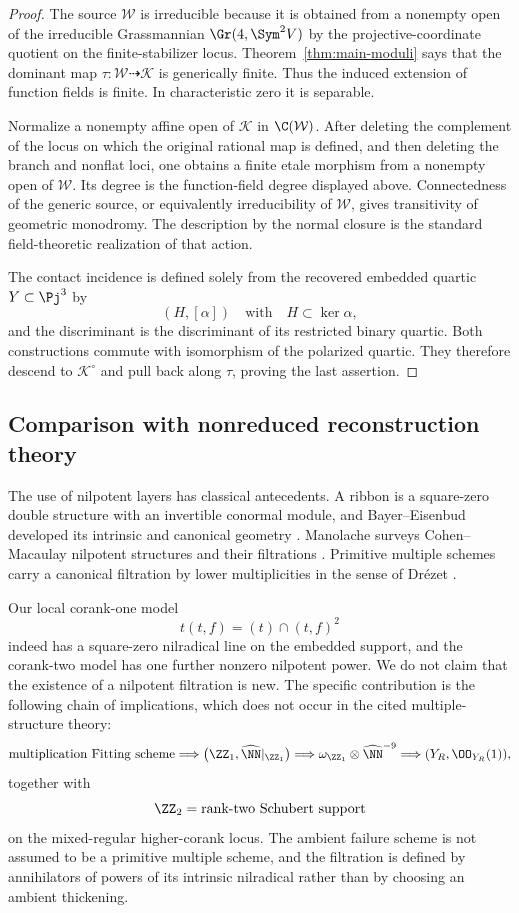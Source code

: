 \begin{proof}
The source \(\mathcal W\) is irreducible because it is obtained from a
nonempty open of the irreducible Grassmannian
\(\Gr(4,\Sym^2V)\) by the projective-coordinate quotient on the
finite-stabilizer locus.  Theorem~\ref{thm:main-moduli} says that the
dominant map \(\tau:\mathcal W\dashrightarrow\mathcal K\) is
generically finite.  Thus the induced extension of function fields is
finite.  In characteristic zero it is separable.

Normalize a nonempty affine open of \(\mathcal K\) in
\(\C(\mathcal W)\).  After deleting the complement of the locus on
which the original rational map is defined, and then deleting the
branch and nonflat loci, one obtains a finite etale morphism from a
nonempty open of \(\mathcal W\).  Its degree is the function-field
degree displayed above.  Connectedness of the generic source, or
equivalently irreducibility of \(\mathcal W\), gives transitivity of
geometric monodromy.  The description by the normal closure is the
standard field-theoretic realization of that action.

The contact incidence is defined solely from the recovered embedded
quartic \(Y\subset\Pj^3\) by
\[
 (H,[\alpha])\quad\text{with}\quad H\subset\ker\alpha,
\]
and the discriminant is the discriminant of its restricted binary
quartic.  Both constructions commute with isomorphism of the polarized
quartic.  They therefore descend to \(\mathcal K^\circ\) and pull
back along \(\tau\), proving the last assertion.
\end{proof}



\subsection{Comparison with nonreduced reconstruction theory}

The use of nilpotent layers has classical antecedents.  A ribbon is a
square-zero double structure with an invertible conormal module, and
Bayer--Eisenbud developed its intrinsic and canonical geometry
\cite{BayerEisenbud}.  Manolache surveys Cohen--Macaulay nilpotent
structures and their filtrations \cite{Manolache}.  Primitive multiple
schemes carry a canonical filtration by lower multiplicities in the
sense of Drézet \cite{Drezet}.

Our local corank-one model
\[
 t(t,f)=(t)\cap(t,f)^2
\]
indeed has a square-zero nilradical line on the embedded support, and
the corank-two model has one further nonzero nilpotent power.  We do
not claim that the existence of a nilpotent filtration is new.  The
specific contribution is the following chain of implications, which
does not occur in the cited multiple-structure theory:
\[
 \text{multiplication Fitting scheme}
 \Longrightarrow
 \bigl(\ZZ_1,\widehat\NN|_{\ZZ_1}\bigr)
 \Longrightarrow
 \omega_{\ZZ_1}\otimes\widehat\NN^{-9}
 \Longrightarrow
 (Y_R,\OO_{Y_R}(1)),
\]
together with
\[
 \ZZ_2=\text{rank-two Schubert support}
\]
on the mixed-regular higher-corank locus.  The ambient failure scheme
is not assumed to be a primitive multiple scheme, and the filtration
is defined by annihilators of powers of its intrinsic nilradical
rather than by choosing an ambient thickening.

